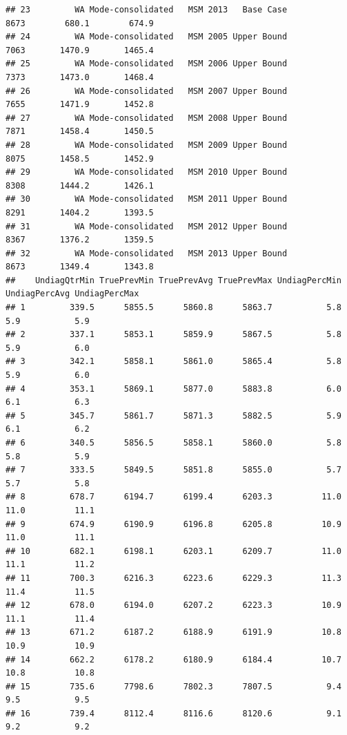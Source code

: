 \documentclass{article}\usepackage[]{graphicx}\usepackage[]{color}
\makeatletter
\newenvironment{kframe}{%
 \def\at@end@of@kframe{}%
 \ifinner\ifhmode%
  \def\at@end@of@kframe{\end{minipage}}%
  \begin{minipage}{\columnwidth}%
 \fi\fi%
 \def\FrameCommand##1{\hskip\@totalleftmargin \hskip-\fboxsep
 \colorbox{shadecolor}{##1}\hskip-\fboxsep
     \hskip-\linewidth \hskip-\@totalleftmargin \hskip\columnwidth}%
 \MakeFramed {\advance\hsize-\width
   \@totalleftmargin\z@ \linewidth\hsize
   \@setminipage}}%
 {\par\unskip\endMakeFramed%
 \at@end@of@kframe}
\newenvironment{knitrout}{}{} %
\makeatother
\begin{document}
\begin{knitrout}
\begin{kframe}
\begin{verbatim}
## 23         WA Mode-consolidated   MSM 2013   Base Case            8673        680.1        674.9
## 24         WA Mode-consolidated   MSM 2005 Upper Bound            7063       1470.9       1465.4
## 25         WA Mode-consolidated   MSM 2006 Upper Bound            7373       1473.0       1468.4
## 26         WA Mode-consolidated   MSM 2007 Upper Bound            7655       1471.9       1452.8
## 27         WA Mode-consolidated   MSM 2008 Upper Bound            7871       1458.4       1450.5
## 28         WA Mode-consolidated   MSM 2009 Upper Bound            8075       1458.5       1452.9
## 29         WA Mode-consolidated   MSM 2010 Upper Bound            8308       1444.2       1426.1
## 30         WA Mode-consolidated   MSM 2011 Upper Bound            8291       1404.2       1393.5
## 31         WA Mode-consolidated   MSM 2012 Upper Bound            8367       1376.2       1359.5
## 32         WA Mode-consolidated   MSM 2013 Upper Bound            8673       1349.4       1343.8
##    UndiagQtrMin TruePrevMin TruePrevAvg TruePrevMax UndiagPercMin UndiagPercAvg UndiagPercMax
## 1         339.5      5855.5      5860.8      5863.7           5.8           5.9           5.9
## 2         337.1      5853.1      5859.9      5867.5           5.8           5.9           6.0
## 3         342.1      5858.1      5861.0      5865.4           5.8           5.9           6.0
## 4         353.1      5869.1      5877.0      5883.8           6.0           6.1           6.3
## 5         345.7      5861.7      5871.3      5882.5           5.9           6.1           6.2
## 6         340.5      5856.5      5858.1      5860.0           5.8           5.8           5.9
## 7         333.5      5849.5      5851.8      5855.0           5.7           5.7           5.8
## 8         678.7      6194.7      6199.4      6203.3          11.0          11.0          11.1
## 9         674.9      6190.9      6196.8      6205.8          10.9          11.0          11.1
## 10        682.1      6198.1      6203.1      6209.7          11.0          11.1          11.2
## 11        700.3      6216.3      6223.6      6229.3          11.3          11.4          11.5
## 12        678.0      6194.0      6207.2      6223.3          10.9          11.1          11.4
## 13        671.2      6187.2      6188.9      6191.9          10.8          10.9          10.9
## 14        662.2      6178.2      6180.9      6184.4          10.7          10.8          10.8
## 15        735.6      7798.6      7802.3      7807.5           9.4           9.5           9.5
## 16        739.4      8112.4      8116.6      8120.6           9.1           9.2           9.2

\end{verbatim}
\end{kframe}
\end{knitrout}
\end{document}
